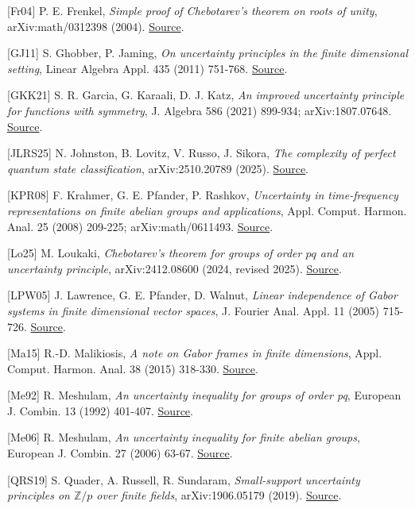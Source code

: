 \documentclass[
  11pt,
  a4paper,
]{article}
\begin{document}
{[}Fr04{]} P. E. Frenkel, \emph{Simple proof of Chebotarev's theorem on
roots of unity}, arXiv:math/0312398 (2004).
\href{https://arxiv.org/abs/math/0312398}{Source}.

{[}GJ11{]} S. Ghobber, P. Jaming, \emph{On uncertainty principles in the
finite dimensional setting}, Linear Algebra Appl. 435 (2011) 751-768.
\href{https://arxiv.org/abs/0903.2923}{Source}.

{[}GKK21{]} S. R. Garcia, G. Karaali, D. J. Katz, \emph{An improved
uncertainty principle for functions with symmetry}, J. Algebra 586
(2021) 899-934; arXiv:1807.07648.
\href{https://arxiv.org/abs/1807.07648}{Source}.

{[}JLRS25{]} N. Johnston, B. Lovitz, V. Russo, J. Sikora, \emph{The
complexity of perfect quantum state classification}, arXiv:2510.20789
(2025). \href{https://arxiv.org/abs/2510.20789}{Source}.

{[}KPR08{]} F. Krahmer, G. E. Pfander, P. Rashkov, \emph{Uncertainty in
time-frequency representations on finite abelian groups and
applications}, Appl. Comput. Harmon. Anal. 25 (2008) 209-225;
arXiv:math/0611493. \href{https://arxiv.org/abs/math/0611493}{Source}.

{[}Lo25{]} M. Loukaki, \emph{Chebotarev's theorem for groups of order
\(pq\) and an uncertainty principle}, arXiv:2412.08600 (2024, revised
2025). \href{https://arxiv.org/abs/2412.08600}{Source}.

{[}LPW05{]} J. Lawrence, G. E. Pfander, D. Walnut, \emph{Linear
independence of Gabor systems in finite dimensional vector spaces}, J.
Fourier Anal. Appl. 11 (2005) 715-726.
\href{https://doi.org/10.1007/s00041-005-5017-6}{Source}.

{[}Ma15{]} R.-D. Malikiosis, \emph{A note on Gabor frames in finite
dimensions}, Appl. Comput. Harmon. Anal. 38 (2015) 318-330.
\href{https://doi.org/10.1016/j.acha.2014.06.004}{Source}.

{[}Me92{]} R. Meshulam, \emph{An uncertainty inequality for groups of
order pq}, European J. Combin. 13 (1992) 401-407.
\href{https://doi.org/10.1016/S0195-6698(05)80019-8}{Source}.

{[}Me06{]} R. Meshulam, \emph{An uncertainty inequality for finite
abelian groups}, European J. Combin. 27 (2006) 63-67.
\href{https://arxiv.org/abs/math/0312407}{Source}.

{[}QRS19{]} S. Quader, A. Russell, R. Sundaram, \emph{Small-support
uncertainty principles on \(\mathbb Z/p\) over finite fields},
arXiv:1906.05179 (2019).
\href{https://arxiv.org/abs/1906.05179}{Source}.
\end{document}
